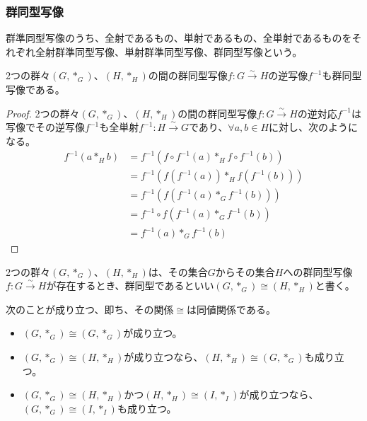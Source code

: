 \documentclass[dvipdfmx]{jsarticle}
\begin{document}
\subsubsection{群同型写像}%
\begin{dfn}
群準同型写像のうち、全射であるもの、単射であるもの、全単射であるものをそれぞれ全射群準同型写像、単射群準同型写像、群同型写像という。
\end{dfn}
\begin{thm}\label{3.1.2.3}
2つの群々$\left( G,*_{G} \right)$、$\left( H,*_{H} \right)$の間の群同型写像$f:G\overset{\sim}{\rightarrow}H$の逆写像$f^{- 1}$も群同型写像である。
\end{thm}
\begin{proof}
2つの群々$\left( G,*_{G} \right)$、$\left( H,*_{H} \right)$の間の群同型写像$f:G\overset{\sim}{\rightarrow}H$の逆対応$f^{- 1}$は写像でその逆写像$f^{- 1}$も全単射$f^{- 1}:H\overset{\sim}{\rightarrow}G$であり、$\forall a,b \in H$に対し、次のようになる。
\begin{align*}
f^{- 1}\left( a*_{H}b \right) &= f^{- 1}\left( f \circ f^{- 1}(a)*_{H}f \circ f^{- 1}(b) \right)\\
&= f^{- 1}\left( f\left( f^{- 1}(a) \right)*_{H}f\left( f^{- 1}(b) \right) \right)\\
&= f^{- 1}\left( f\left( f^{- 1}(a)*_{G}f^{- 1}(b) \right) \right)\\
&= f^{- 1} \circ f\left( f^{- 1}(a)*_{G}f^{- 1}(b) \right)\\
&= f^{- 1}(a)*_{G}f^{- 1}(b)
\end{align*}
\end{proof}
\begin{dfn}
2つの群々$\left( G,*_{G} \right)$、$\left( H,*_{H} \right)$は、その集合$G$からその集合$H$への群同型写像$f:G\overset{\sim}{\rightarrow}H$が存在するとき、群同型であるといい$\left( G,*_{G} \right) \cong \left( H,*_{H} \right)$と書く。
\end{dfn}
\begin{thm}\label{3.1.2.4}
次のことが成り立つ、即ち、その関係$\cong$は同値関係である。
\begin{itemize}
\item
  $\left( G,*_{G} \right) \cong \left( G,*_{G} \right)$が成り立つ。
\item
  $\left( G,*_{G} \right) \cong \left( H,*_{H} \right)$が成り立つなら、$\left( H,*_{H} \right) \cong \left( G,*_{G} \right)$も成り立つ。
\item
  $\left( G,*_{G} \right) \cong \left( H,*_{H} \right)$かつ$\left( H,*_{H} \right) \cong \left( I,*_{I} \right)$が成り立つなら、$\left( G,*_{G} \right) \cong \left( I,*_{I} \right)$も成り立つ。
\end{itemize}
\end{thm}\par
\end{document}
